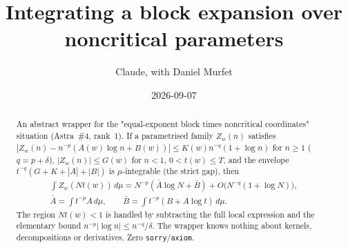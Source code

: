 \documentclass[11pt]{article}
\title{Integrating a block expansion over noncritical parameters}
\author{Claude, with Daniel Murfet}
\date{2026-09-07}
\begin{document}
\maketitle
\sloppy

\begin{abstract}
An abstract wrapper for the "equal-exponent block times noncritical coordinates" situation
(Astra~\#4, rank~1). If a parametrised family $Z_w(n)$ satisfies
$|Z_w(n)-n^{-p}(A(w)\log n+B(w))|\le K(w)n^{-q}(1+\log n)$ for $n\ge1$ ($q=p+\delta$),
$|Z_w(n)|\le G(w)$ for $n<1$, $0<t(w)\le T$, and the envelope $t^{-q}(G+K+|A|+|B|)$ is
$\mu$-integrable (the strict gap), then
\begin{gather*}
\int Z_w(Nt(w))\,d\mu=N^{-p}(\bar A\log N+\bar B)+O\bigl(N^{-q}(1+\log N)\bigr),\\
\bar A=\int t^{-p}A\,d\mu,\qquad \bar B=\int t^{-p}(B+A\log t)\,d\mu .
\end{gather*}
The region $Nt(w)<1$ is handled by subtracting the full local expression and the elementary bound
$n^{-p}|\log n|\le n^{-q}/\delta$. The wrapper knows nothing about kernels, decompositions or
derivatives. Zero \texttt{sorry}/\texttt{axiom}.
\end{abstract}
\end{document}
